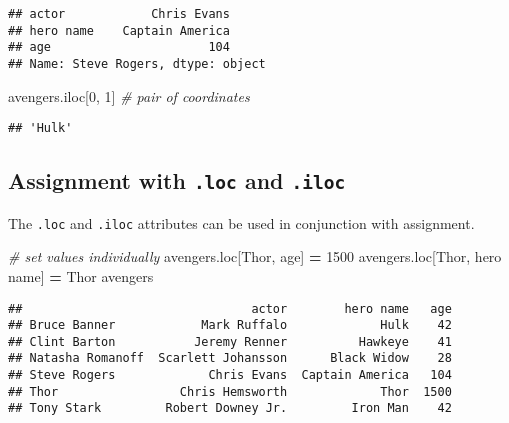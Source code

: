 \documentclass[
]{book}
\newenvironment{Shaded}{\begin{snugshade}}{\end{snugshade}}
\newcommand{\CommentTok}[1]{\textcolor[rgb]{0.56,0.35,0.01}{\textit{#1}}}
\newcommand{\DecValTok}[1]{\textcolor[rgb]{0.00,0.00,0.81}{#1}}
\newcommand{\NormalTok}[1]{#1}
\newcommand{\OperatorTok}[1]{\textcolor[rgb]{0.81,0.36,0.00}{\textbf{#1}}}
\newcommand{\StringTok}[1]{\textcolor[rgb]{0.31,0.60,0.02}{#1}}
\begin{document}
\begin{verbatim}
## actor            Chris Evans
## hero name    Captain America
## age                      104
## Name: Steve Rogers, dtype: object
\end{verbatim}

\begin{Shaded}
\begin{Highlighting}[]
\NormalTok{avengers.iloc[}\DecValTok{0}\NormalTok{, }\DecValTok{1}\NormalTok{] }\CommentTok{\# pair of coordinates}
\end{Highlighting}
\end{Shaded}

\begin{verbatim}
## 'Hulk'
\end{verbatim}

\hypertarget{assignment-with-.loc-and-.iloc}{%
\subsection{\texorpdfstring{Assignment with \texttt{.loc} and \texttt{.iloc}}{Assignment with .loc and .iloc}}\label{assignment-with-.loc-and-.iloc}}

The \texttt{.loc} and \texttt{.iloc} attributes can be used in conjunction with assignment.

\begin{Shaded}
\begin{Highlighting}[]
\CommentTok{\# set values individually}
\NormalTok{avengers.loc[}\StringTok{\textquotesingle{}Thor\textquotesingle{}}\NormalTok{, }\StringTok{\textquotesingle{}age\textquotesingle{}}\NormalTok{] }\OperatorTok{=} \DecValTok{1500}
\NormalTok{avengers.loc[}\StringTok{\textquotesingle{}Thor\textquotesingle{}}\NormalTok{, }\StringTok{\textquotesingle{}hero name\textquotesingle{}}\NormalTok{] }\OperatorTok{=} \StringTok{\textquotesingle{}Thor\textquotesingle{}}
\NormalTok{avengers}
\end{Highlighting}
\end{Shaded}

\begin{verbatim}
##                                actor        hero name   age
## Bruce Banner            Mark Ruffalo             Hulk    42
## Clint Barton           Jeremy Renner          Hawkeye    41
## Natasha Romanoff  Scarlett Johansson      Black Widow    28
## Steve Rogers             Chris Evans  Captain America   104
## Thor                 Chris Hemsworth             Thor  1500
## Tony Stark         Robert Downey Jr.         Iron Man    42
\end{verbatim}
\end{document}
